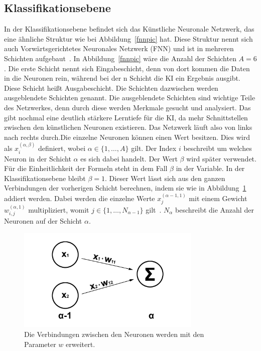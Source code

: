 \documentclass[11pt]{article}
\begin{document}
\subsection{Klassifikationsebene}\label{fcnn}
In der Klassifikationsebene befindet sich das Künstliche Neuronale Netzwerk, das eine ähnliche Struktur wie bei Abbildung~\ref{fnnpic} hat.
Diese Struktur nennt sich auch Vorwärtsgerichtetes Neuronales Netzwerk (FNN) und ist in mehreren Schichten aufgebaut~\cite{5}. In Abbildung~\ref{fnnpic} wäre die Anzahl
der Schichten $A = 6$. Die erste Schicht nennt sich Eingabeschicht, denn von dort kommen die Daten in die Neuronen rein, während bei
der n Schicht die KI ein Ergebnis ausgibt. Diese Schicht heißt Ausgabeschicht. Die Schichten dazwischen werden ausgeblendete Schichten genannt.
Die ausgeblendete Schichten sind wichtige Teile des Netzwerkes, denn durch diese werden Merkmale gesucht und analysiert.
Das gibt nochmal eine deutlich stärkere Lerntiefe für die KI, da mehr Schnittstellen zwischen den künstlichen Neuronen existieren.
Das Netzwerk läuft also von links nach rechts durch.\@ Die einzelne Neuronen können einen Wert besitzen. Dies wird als $ x_{i}^{(\alpha,\beta)} $ definiert,
wobei $ \alpha \in \{1,\ldots,A\} $ gilt. Der Index $i$ beschreibt um welches Neuron in der Schicht $\alpha$ es sich dabei handelt. Der Wert $\beta$ wird später
verwendet. Für die Einheitlichkeit der Formeln steht in dem Fall $\beta$ in der Variable. In der Klassifikationsebene bleibt $\beta = 1$. Dieser Wert
lässt sich aus den ganzen Verbindungen der vorherigen Schicht berechnen, indem sie wie in Abbildung~\ref{connection} addiert werden. Dabei werden
die einzelne Werte $ x_{j}^{(\alpha-1,1)} $ mit einem Gewicht $ w_{i,j}^{(\alpha,1)} $ multipliziert, womit $ j \in \{1,\ldots,N_{\alpha-1}\} $ gilt~\cite{5}.
$ N_{\alpha} $ beschreibt die Anzahl der Neuronen auf der Schicht $\alpha$.
\begin{figure}[h]
    \centering
    \includegraphics[width=250pt, keepaspectratio]{images/verbindung}
    \caption[Verbindungen zwischen den Neuronen]{Die Verbindungen zwischen den Neuronen werden mit den Parameter $w$ erweitert.}\label{connection}
\end{figure}
\end{document}
